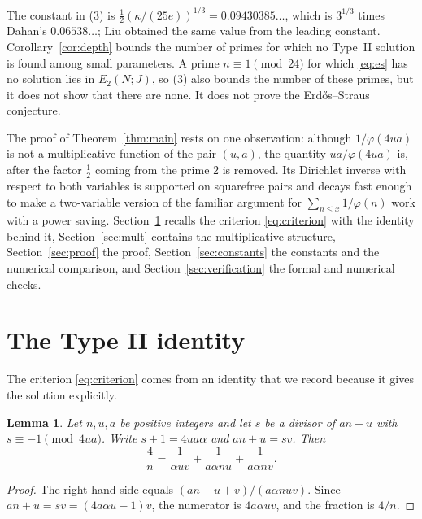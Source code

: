 \documentclass{amsart}
\newtheorem{lemma}[theorem]{Lemma}
\theoremstyle{definition}
\theoremstyle{remark}
\numberwithin{equation}{section}
\begin{document}
The constant in (3) is $\frac12(\kappa/(25e))^{1/3}=0.09430385\ldots$, which is $3^{1/3}$ times Dahan's $0.06538\ldots$; Liu \cite{Liu} obtained the same value from the leading constant. Corollary~\ref{cor:depth} bounds the number of primes for which no Type~II solution is found among small parameters. A prime $n\equiv1\pmod{24}$ for which \eqref{eq:es} has no solution lies in $E_2(N;J)$, so (3) also bounds the number of these primes, but it does not show that there are none. It does not prove the Erd\H{o}s--Straus conjecture.

The proof of Theorem~\ref{thm:main} rests on one observation: although $1/\varphi(4ua)$ is not a multiplicative function of the pair $(u,a)$, the quantity $ua/\varphi(4ua)$ is, after the factor $\frac12$ coming from the prime $2$ is removed. Its Dirichlet inverse with respect to both variables is supported on squarefree pairs and decays fast enough to make a two-variable version of the familiar argument for $\sum_{n\le x}1/\varphi(n)$ \cite{Mon} work with a power saving. Section~\ref{sec:typeII} recalls the criterion \eqref{eq:criterion} with the identity behind it, Section~\ref{sec:mult} contains the multiplicative structure, Section~\ref{sec:proof} the proof, Section~\ref{sec:constants} the constants and the numerical comparison, and Section~\ref{sec:verification} the formal and numerical checks.

\section{The Type II identity}\label{sec:typeII}

The criterion \eqref{eq:criterion} comes from an identity that we record because it gives the solution explicitly.

\begin{lemma}\label{lem:identity}
Let $n,u,a$ be positive integers and let $s$ be a divisor of $an+u$ with $s\equiv-1\pmod{4ua}$. Write $s+1=4ua\alpha$ and $an+u=sv$. Then
\begin{equation}\label{eq:identity}
\frac4n=\frac1{\alpha uv}+\frac1{a\alpha nu}+\frac1{a\alpha nv}.
\end{equation}
\end{lemma}

\begin{proof}
The right-hand side equals $(an+u+v)/(a\alpha nuv)$. Since $an+u=sv=(4a\alpha u-1)v$, the numerator is $4a\alpha uv$, and the fraction is $4/n$.
\end{proof}
\end{document}

